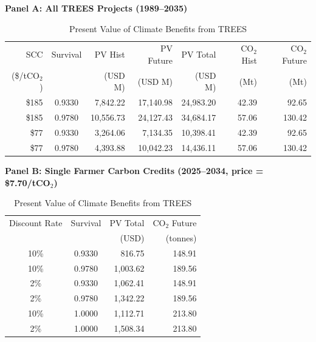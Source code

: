 \begin{table}[!htbp]
\centering
\caption{Present Value of Climate Benefits from TREES}
\label{tab:value_scc}
\small

\textbf{Panel A: All TREES Projects (1989--2035)}

\begin{tabular}{rcrrrrr}
\toprule
SCC & Survival & PV Hist & PV Future & PV Total & CO$_2$ Hist & CO$_2$ Future \\
(\$/tCO$_2$) & & (USD M) & (USD M) & (USD M) & (Mt) & (Mt) \\
\midrule
\$185 & 0.9330 & 7,842.22 & 17,140.98 & 24,983.20 & 42.39 & 92.65 \\
\$185 & 0.9780 & 10,556.73 & 24,127.43 & 34,684.17 & 57.06 & 130.42 \\
\$77 & 0.9330 & 3,264.06 & 7,134.35 & 10,398.41 & 42.39 & 92.65 \\
\$77 & 0.9780 & 4,393.88 & 10,042.23 & 14,436.11 & 57.06 & 130.42 \\
\bottomrule
\end{tabular}

\vspace{1em}

\textbf{Panel B: Single Farmer Carbon Credits (2025--2034, price = \$7.70/tCO$_2$)}

\begin{tabular}{ccrr}
\toprule
Discount Rate & Survival & PV Total & CO$_2$ Future \\
 & & (USD) & (tonnes) \\
\midrule
10\% & 0.9330 & 816.75 & 148.91 \\
10\% & 0.9780 & 1,003.62 & 189.56 \\
2\% & 0.9330 & 1,062.41 & 148.91 \\
2\% & 0.9780 & 1,342.22 & 189.56 \\
10\% & 1.0000 & 1,112.71 & 213.80 \\
2\% & 1.0000 & 1,508.34 & 213.80 \\
\bottomrule
\end{tabular}

\end{table}

